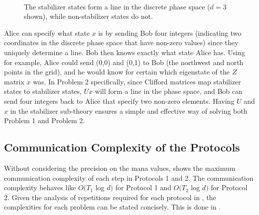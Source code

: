 \documentclass[../3Wworkreport.tex]{subfiles}
\begin{document}
\begin{figure}[h]
	\begin{center}
		\\
		\caption[Discrete phase space and stabilizer states]{The stabilizer states form a line in the discrete phase space ($d = 3$ shown), while non-stabilizer states do not.}
	\end{center}
\end{figure}

Alice can specify what state $x$ is by sending Bob four integers (indicating two coordinates in the discrete phase space that have non-zero values) since they uniquely determine a line. Bob then knows exactly what state Alice has. Using  for example, Alice could send (0,0) and (0,1) to Bob (the northwest and north points in the grid), and he would know for certain which eigenstate of the $Z$ matrix $x$ was. In Problem 2 specifically, since Clifford matrices map stabilizer states to stabilizer states, $Ux$ will form a line in the phase space, and Bob can send four integers back to Alice that specify two non-zero elements. Having $U$ and $x$ in the stabilizer sub-theory ensures a simple and effective way of solving both Problem 1 and Problem 2.

\subsection{Communication Complexity of the Protocols}
\label{subsec:complexity}
Without considering the precision on the mana values,  shows the maximum communication complexity of each step in Protocols 1 and 2. The communication complexity behaves like $O(T_1$ log $d)$ for Protocol 1 and $O(T_2$ log $d)$ for Protocol 2. Given the analysis of repetitions required for each protocol in , the complexities for each problem can be stated concisely. This is done in .\\
\end{document}
